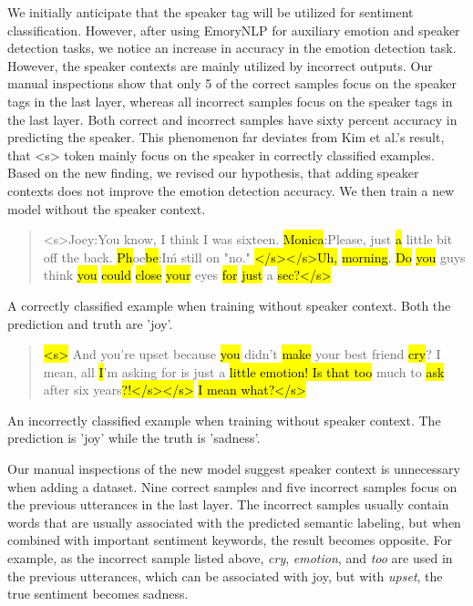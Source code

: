 \documentclass[11pt]{article}
\begin{document}
We initially anticipate that the speaker tag will be utilized for sentiment classification. However, after using EmoryNLP for auxiliary emotion and speaker detection tasks, we notice an increase in accuracy in the emotion detection task. However, the speaker contexts are mainly utilized by incorrect outputs. Our manual inspections show that only 5 of the correct samples focus on the speaker tags in the last layer, whereas all incorrect samples focus on the speaker tags in the last layer. Both correct and incorrect samples have sixty percent accuracy in predicting the speaker. This phenomenon far deviates from Kim et al.'s result, that <s> token mainly focus on the speaker in correctly classified examples. Based on the new finding, we revised our hypothesis, that adding speaker contexts does not improve the emotion detection accuracy. We then train a new model without the speaker context.

{\small
\begin{quote}

<s>Joey:You know, I think I was sixteen. \hl{Monica}:Please, just \hl{a} little bit off the back. \hl{Ph}oe\hl{be}:I\'m still on "no." \hl{</s></s>Uh,} \hl{morning}. \hl{Do} \hl{you} guys think \hl{you} \hl{could} \hl{close} \hl{your} eyes \hl{for} \hl{just} a \hl{sec}\hl{?</s>}

\end{quote}

A correctly classified example when training without speaker context. Both the prediction and truth are 'joy'.

\begin{quote}

\hl{<s>} And you’re upset because \hl{you} didn’t \hl{make} your best friend \hl{cry}? I mean, all \hl{I}’m asking for is just a \hl{little emotion! Is that too} much to \hl{ask} after six years\hl{?!}\hl{</s></s>} \hl{I mean what}\hl{?</s>}

\end{quote}

An incorrectly classified example when training without speaker context. The prediction is 'joy' while the truth is 'sadness'.}

Our manual inspections of the new model suggest speaker context is unnecessary when adding a dataset. Nine correct samples and five incorrect samples focus on the previous utterances in the last layer. The incorrect samples usually contain words that are usually associated with the predicted semantic labeling, but when combined with important sentiment keywords, the result becomes opposite. For example, as the incorrect sample listed above, \textit{cry}, \textit{emotion}, and \textit{too} are used in the previous utterances, which can be associated with joy, but with \textit{upset}, the true sentiment becomes sadness.
\end{document}
